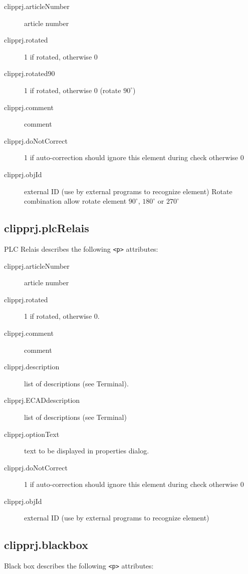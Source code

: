 \documentclass[%
	a4paper,
	oneside,
	listof=numbered,
	parskip=half,
	headsepline=true,
	footsepline=false,
	normalheadings,
	0.7headlines,
	headexclude,
	]{scrbook}
\begin{document}
\begin{description}
	\item[clipprj.articleNumber] article number
	\item[clipprj.rotated] 1 if rotated, otherwise 0
	\item[clipprj.rotated90] 1 if rotated, otherwise 0 (rotate $90^\circ$) 
	\item[clipprj.comment] comment
	\item[clipprj.doNotCorrect] 1 if auto-correction should ignore this element during check otherwise 0
	\item[clipprj.objId] external ID (use by external programs to recognize element) Rotate combination allow rotate element $90^\circ$, $180^\circ$ or $270^\circ$
\end{description}

\subsection{clipprj.plcRelais}
 
PLC Relais describes the following \verb|<p>| attributes: 

\begin{description}
	\item[clipprj.articleNumber] article number 
	\item[clipprj.rotated] 1 if rotated, otherwise 0. 
	\item[clipprj.comment] comment 
	\item[clipprj.description] list of descriptions (see Terminal). 
	\item[clipprj.ECADdescription] list of descriptions (see Terminal) 
	\item[clipprj.optionText] text to be displayed in properties dialog. 
	\item[clipprj.doNotCorrect] 1 if auto-correction should ignore this element during check otherwise 0 
	\item[clipprj.objId] external ID (use by external programs to recognize element)
\end{description}

\subsection{clipprj.blackbox}
 
Black box describes the following \verb|<p>| attributes: 
\end{document}
